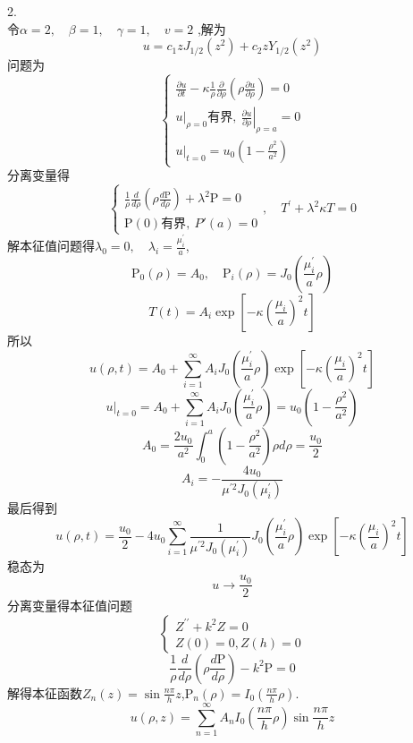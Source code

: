 \documentclass[UTF8,9pt]{ctexart}
\begin{document}
2.\\令$\alpha=2, \quad \beta=1, \quad \gamma=1, \quad v=2$
,解为
$$ 
u=c_{1} z J_{1 / 2}\left(z^{2}\right)+c_{2} z Y_{1 / 2}\left(z^{2}\right)
$$
问题为$$ 
\left\{\begin{array}{c}
{\frac{\partial u}{\partial t}-\kappa \frac{1}{\rho} \frac{\partial}{\partial \rho}\left(\rho \frac{\partial u}{\partial \rho}\right)=0} \\ 
{u\big|_{\rho=0}\text{有界},\ \left.\frac{\partial u}{\partial \rho}\right|_{\rho=a}=0} \\ 
{\left.u\right|_{t=0}=u_{0}\left(1-\frac{\rho^{2}}{a^{2}}\right)}
\end{array}\right.
$$
分离变量得$$ 
\left\{\begin{array}{l}{\frac{1}{\rho} \frac{d}{d \rho}\left(\rho \frac{d \mathrm{P}}{d \rho}\right)+\lambda^{2} \mathrm{P}=0} \\ {\mathrm{P}(0)\text{有界},\ P'(a)=0}\end{array}\right.,\quad T^{\prime}+\lambda^{2} \kappa T=0
$$
解本征值问题得$\lambda_{0}=0, \quad \lambda_{i}=\frac{\mu_{i}^{\prime}}{a}$,
$$\mathrm{P}_{0}(\rho)=A_{0}, \quad \mathrm{P}_{i}(\rho)=J_{0}\left(\frac{\mu_{i}^{\prime}}{a} \rho\right)$$
$$ 
T(t)=A_{i} \exp \left[-\kappa\left(\frac{\mu_{i}}{a}\right)^{2} t\right]
$$
所以$$ 
u(\rho, t)=A_{0}+\sum_{i=1}^{\infty} A_{i} J_{0}\left(\frac{\mu_{i}^{\prime}}{a} \rho\right) \exp \left[-\kappa\left(\frac{\mu_{i}}{a}\right)^{2} t\right]
$$$$ 
\left.u\right|_{t=0}=A_{0}+\sum_{i=1}^{\infty} A_{i} J_{0}\left(\frac{\mu_{i}^{\prime}}{a} \rho\right)=u_{0}\left(1-\frac{\rho^{2}}{a^{2}}\right)
$$$$ 
A_{0}=\frac{2 u_{0}}{a^{2}} \int_{0}^{a}\left(1-\frac{\rho^{2}}{a^{2}}\right) \rho d \rho=\frac{u_{0}}{2}
$$$$ 
A_{i}=-\frac{4 u_{0}}{\mu^{\prime 2} J_{0}\left(\mu_{i}^{\prime}\right)}
$$最后得到$$ 
u(\rho, t)=\frac{u_{0}}{2}-4 u_{0} \sum_{i=1}^{\infty} \frac{1}{\mu^{\prime 2} J_{0}\left(\mu_{i}^{\prime}\right)} J_{0}\left(\frac{\mu_{i}^{\prime}}{a} \rho\right) \exp \left[-\kappa\left(\frac{\mu_{i}}{a}\right)^{2} t\right]
$$
稳态为$$ 
u \rightarrow \frac{u_{0}}{2}
$$
分离变量得本征值问题$$ 
\left\{\begin{array}{l}{Z^{\prime \prime}+k^{2} Z=0} \\ {Z(0)=0, Z(h)=0}\end{array}\right.
$$$$ 
\frac{1}{\rho} \frac{d}{d \rho}\left(\rho \frac{d \mathrm{P}}{d \rho}\right)-k^{2} \mathrm{P}=0
$$
解得本征函数$Z_{n}(z)=\sin \frac{n \pi}{h} z$,$\mathrm{P}_{n}(\rho)=I_{0}\left(\frac{n \pi}{h} \rho\right)$.$$ 
u(\rho, z)=\sum_{n=1}^{\infty} A_{n} I_{0}\left(\frac{n \pi}{h} \rho\right) \sin \frac{n \pi}{h} z
$$
\end{document}
